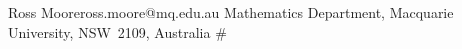 \ifx\xyloaded\undefined  \fi
{}%
 {Ross Moore}{ross.moore@mq.edu.au}%
 {Mathematics Department, Macquarie University, NSW~2109, Australia}
\xydef@{}
\xyendinput
#
